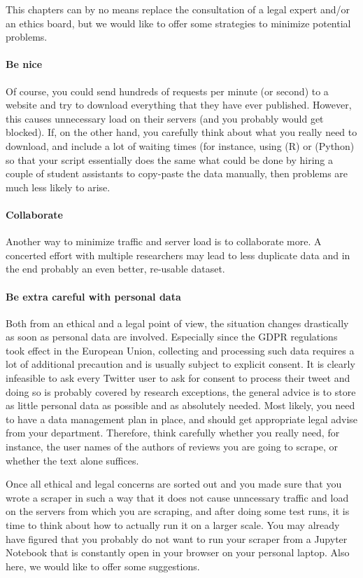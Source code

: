 This chapters can by no means replace the consultation of a legal
expert and/or an ethics board, but we would like to offer some
strategies to minimize potential problems.

\paragraph{Be nice} Of course, you could send hundreds of requests per minute (or second) to a website and try to download everything that they have ever published. However, this causes unnecessary load on their servers (and you probably would get blocked). If, on the other hand, you carefully think about what you really need to download, and include a lot of waiting times (for instance, using  (R) or  (Python) so that your script essentially does the same what could be done by hiring a couple of student assistants to copy-paste the data manually, then problems are much less likely to arise.

\paragraph{Collaborate} Another way to minimize traffic and server load is to collaborate more. A concerted effort with multiple researchers may lead to less duplicate data and in the end probably an even better, re-usable dataset.

\paragraph{Be extra careful with personal data} Both from an ethical and a legal point of view, the situation changes drastically as soon as personal data are involved. Especially since the GDPR regulations took effect in the European Union, collecting and processing such data requires a lot of additional precaution and is usually subject to explicit consent. It is clearly infeasible to ask every Twitter user to ask for consent to process their tweet and doing so is probably covered by research exceptions, the general advice is to store as little personal data as possible and as absolutely needed. Most likely, you need to have a data management plan in place, and should get appropriate legal advise from your department. Therefore, think carefully whether you really need, for instance, the user names of the authors of reviews you are going to scrape, or whether the text alone suffices.

Once all ethical and legal concerns are sorted out and you made sure that you wrote a scraper in such a way that it does not cause unncessary traffic and load on the servers from which you are scraping, and after doing some test runs, it is time to think about how to actually run it on a larger scale. You may already have figured that you probably do not want to run your scraper from a Jupyter Notebook that is constantly open in your browser on your personal laptop. Also here, we would like to offer some suggestions.


